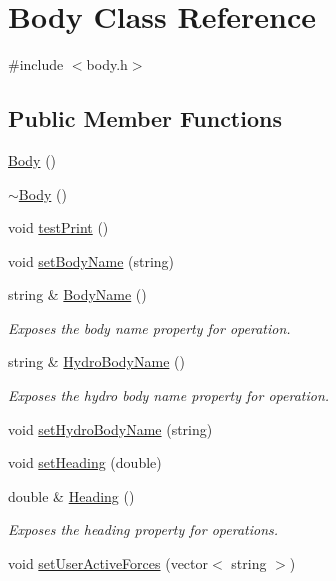\hypertarget{class_body}{\section{Body Class Reference}
\label{class_body}
}


{\ttfamily \#include $<$body.\-h$>$}

\subsection*{Public Member Functions}
\begin{DoxyCompactItemize}
\item 
\hyperlink{class_body_a7727b0d8c998bbc2942e4c802e31e2eb}{Body} ()
\item 
\hyperlink{class_body_abe1c4da65568cf7978b6247affc461e3}{$\sim$\-Body} ()
\item 
void \hyperlink{class_body_a31b959b6f30e3c9c6ebc3f0a325fec9d}{test\-Print} ()
\item 
void \hyperlink{class_body_a21190f9d796d631202db6caf768beae1}{set\-Body\-Name} (string)
\item 
string \& \hyperlink{class_body_aaeacf4b8d79625bc8c6d77544c6ecfb7}{Body\-Name} ()
\begin{DoxyCompactList}\small\item\em Exposes the body name property for operation. \end{DoxyCompactList}\item 
string \& \hyperlink{class_body_aaf7cbd04e863d70e71c3de1819df9c37}{Hydro\-Body\-Name} ()
\begin{DoxyCompactList}\small\item\em Exposes the hydro body name property for operation. \end{DoxyCompactList}\item 
void \hyperlink{class_body_ac2cb95c1a4d24e6b456db9bfe3e6dea3}{set\-Hydro\-Body\-Name} (string)
\item 
void \hyperlink{class_body_a7bba55a8fd4aea7a17ce7bd5f54d6ab8}{set\-Heading} (double)
\item 
double \& \hyperlink{class_body_aef98ce381a5f74886a082dbaf40810c2}{Heading} ()
\begin{DoxyCompactList}\small\item\em Exposes the heading property for operations. \end{DoxyCompactList}\item 
void \hyperlink{class_body_aaa26153bd320830684e65bbf538b139d}{set\-User\-Active\-Forces} (vector$<$ string $>$)

\end{DoxyCompactItemize}

